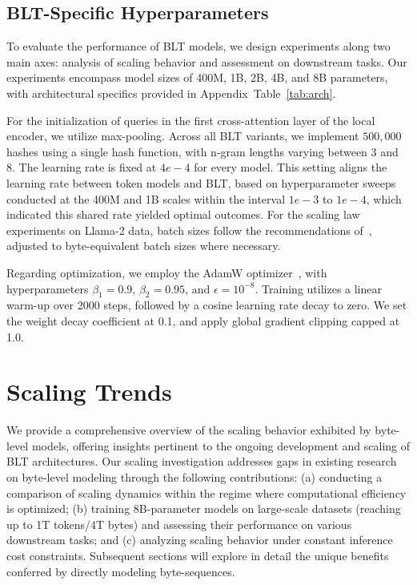 \subsection{{\textsc BLT}-Specific Hyperparameters} 

To evaluate the performance of {\textsc BLT} models, we design experiments along two main axes: analysis of scaling behavior and assessment on downstream tasks. Our experiments encompass model sizes of 400M, 1B, 2B, 4B, and 8B parameters, with architectural specifics provided in Appendix~Table~\ref{tab:arch}. 

For the initialization of queries in the first cross-attention layer of the local encoder, we utilize max-pooling. Across all {\textsc BLT} variants, we implement $500,000$ hashes using a single hash function, with n-gram lengths varying between 3 and 8. The learning rate is fixed at $4e-4$ for every model. This setting aligns the learning rate between token models and {\textsc BLT}, based on hyperparameter sweeps conducted at the 400M and 1B scales within the interval $1e-3$ to $1e-4$, which indicated this shared rate yielded optimal outcomes. For the scaling law experiments on Llama-2 data, batch sizes follow the recommendations of~\cite{dubey2024llama}, adjusted to byte-equivalent batch sizes where necessary. 

Regarding optimization, we employ the AdamW optimizer~\citep{adamw}, with hyperparameters $\beta_1=0.9$, $\beta_2=0.95$, and $\epsilon=10^{-8}$. Training utilizes a linear warm-up over 2000 steps, followed by a cosine learning rate decay to zero. We set the weight decay coefficient at 0.1, and apply global gradient clipping capped at 1.0.

\section{Scaling Trends}
\label{section:scaling}

We provide a comprehensive overview of the scaling behavior exhibited by byte-level models, offering insights pertinent to the ongoing development and scaling of {\textsc BLT} architectures. Our scaling investigation addresses gaps in existing research on byte-level modeling through the following contributions: (a) conducting a comparison of scaling dynamics within the regime where computational efficiency is optimized; (b) training 8B-parameter models on large-scale datasets (reaching up to 1T tokens/4T bytes) and assessing their performance on various downstream tasks; and (c) analyzing scaling behavior under constant inference cost constraints. Subsequent sections will explore in detail the unique benefits conferred by directly modeling byte-sequences.

